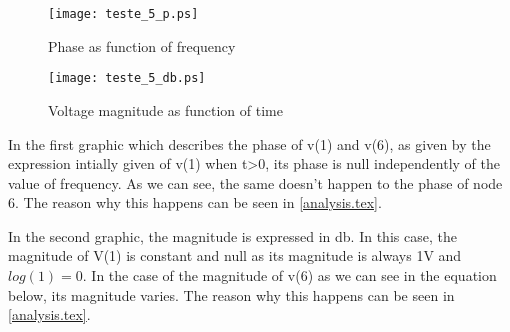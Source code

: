 \begin{figure}[h] \centering
\texttt{[image: teste\_5\_p.ps]}
\caption{Phase as function of frequency}
\label{fig:Ph(v(1))*180/pi Ph(v(6))*180/pi}
\end{figure}

\begin{figure}[h] \centering
\texttt{[image: teste\_5\_db.ps]}
\caption{Voltage magnitude as function of time}
\label{fig:db(v(1)) db(v(6))}
\end{figure}

\par In the first graphic which describes the phase of v(1) and v(6), as given by the expression intially given of v(1) when t>0, its phase is null independently of the value of frequency.  As we can see, the same doesn't happen to the phase of node 6. The reason why this happens can be seen in \ref{analysis.tex}.

\par In the second graphic, the magnitude is expressed in db. In this case, the magnitude of V(1) is constant and null as its magnitude is always 1V and $log(1)=0$. In the case of the magnitude of v(6) as we can see in the equation below, its magnitude varies. The reason why this happens can be seen in \ref{analysis.tex}. 


 
